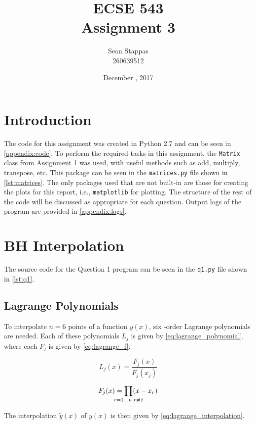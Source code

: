 \documentclass[a4paper,titlepage]{article}
\title{\textbf{ECSE 543 \\ Assignment 3}}
\author{Sean Stappas \\ 260639512}
\date{December \nth{7}, 2017}
\begin{document}
	\sloppy
	\maketitle
	
	\tableofcontents
	
	
	\twocolumn
	
	\section*{Introduction}
	The code for this assignment was created in Python 2.7 and can be seen in \autoref{appendix:code}. To perform the required tasks in this assignment, the \texttt{Matrix} class from Assignment 1 was used, with useful methods such as add, multiply, transpose, etc. This package can be seen in the \texttt{matrices.py} file shown in \autoref{lst:matrices}. The only packages used that are not built-in are those for creating the plots for this report, i.e., \texttt{matplotlib} for plotting. The structure of the rest of the code will be discussed as appropriate for each question. Output logs of the program are provided in \autoref{appendix:logs}.
	
	
	\section{BH Interpolation}
	The source code for the Question 1 program can be seen in the \texttt{q1.py} file shown in \cref{lst:q1}.
	
	\subsection{Lagrange Polynomials}
	To interpolate $n=6$ points of a function $y(x)$, six -order Lagrange polynomials are needed. Each of these polynomials $L_j$ is given by \cref{eq:lagrange_polynomial}, where each $F_j$ is given by \cref{eq:lagrange_f}.
	
	\begin{equation} \label{eq:lagrange_polynomial}
		L_j(x) = \frac{F_j(x)}{F_j(x_j)}
	\end{equation}
	
	\begin{equation} \label{eq:lagrange_f}
		F_j(x) = \smashoperator{\prod\limits_{r=1 \ldots n, r \neq j}} (x - x_r)
	\end{equation}
	
	The interpolation $\tilde{y}(x)$ of $y(x)$ is then given by \cref{eq:lagrange_interpolation}.
	
\end{document}
